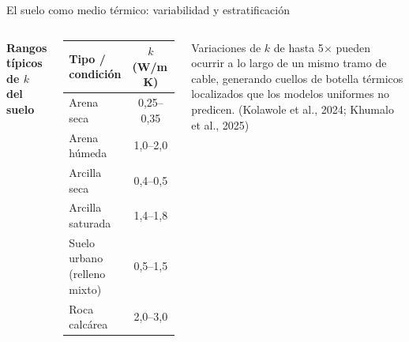\documentclass[aspectratio=169]{beamer}
\newcommand{\refcite}[1]{{\footnotesize\color{gray!70!black} #1}}
\begin{document}
\begin{frame}{El suelo como medio térmico: variabilidad y estratificación}
\begin{columns}[T]
\small\textbf{Rangos típicos de $k$ del suelo}
\vspace{0.15em}
\begin{center}\scriptsize
\begin{tabular}{lc}
\toprule
\textbf{Tipo / condición}         & \textbf{$k$ (W/m\,K)} \\
\midrule
Arena seca                         & 0{,}25--0{,}35 \\
Arena húmeda                       & 1{,}0--2{,}0 \\
Arcilla seca                       & 0{,}4--0{,}5 \\
Arcilla saturada                   & 1{,}4--1{,}8 \\
Suelo urbano (relleno mixto)       & 0{,}5--1{,}5 \\
Roca calcárea                      & 2{,}0--3{,}0 \\
\bottomrule
\end{tabular}
\end{center}
\vspace{0.2em}
\begin{alertblock}{}\scriptsize
Variaciones de $k$ de hasta 5$\times$ pueden ocurrir a lo largo de
un mismo tramo de cable, generando cuellos de botella térmicos
localizados que los modelos uniformes no predicen.
\refcite{(Kolawole et al., 2024; Khumalo et al., 2025)}
\end{alertblock}
\end{columns}
\end{frame}
\end{document}
